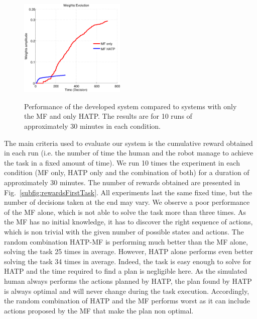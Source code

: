 \documentclass[english,a4paper,11pt,twoside]{StyleThese}
\begin{document}
\begin{figure}[!h]
{        \centering
        \includegraphics[width=0.45\textwidth]{figs/Chapter7/WeightEvolFirstTask.pdf}
       \label{subfig:weightsFirstTask}
   }
    \caption{Performance of the developed system compared to systems with only the MF and only HATP. The results are for 10 runs of approximately 30 minutes in each condition.}
    \label{fig:resultsFirstTask}
\end{figure}

The main criteria used to evaluate our system is the cumulative reward obtained in each run (i.e. the number of time the human and the robot manage to achieve the task in a fixed amount of time). We run 10 times the experiment in each condition (MF only, HATP only and the combination of both) for a duration of approximately 30 minutes. The number of rewards obtained are presented in Fig.~\ref{subfig:rewardsFirstTask}. All experiments last the same fixed time, but the number of decisions taken at the end may vary.  We observe a poor performance of the MF alone, which is not able to solve the task more than three times. As the MF has no initial knowledge, it has to discover the right sequence of actions, which is non trivial with the given number of possible states and actions.
The random combination HATP-MF is performing much better than the MF alone, solving the task 25 times in average. However, HATP alone performs even better solving the task 34 times in average. Indeed, the task is easy enough to solve for HATP and the time required to find a plan is negligible here. As the simulated human always performs the actions planned by HATP, the plan found by HATP is always optimal and will never change during the task execution. Accordingly, the random combination of HATP and the MF performs worst as it can include actions proposed by the MF that make the plan non optimal.
\end{document}

